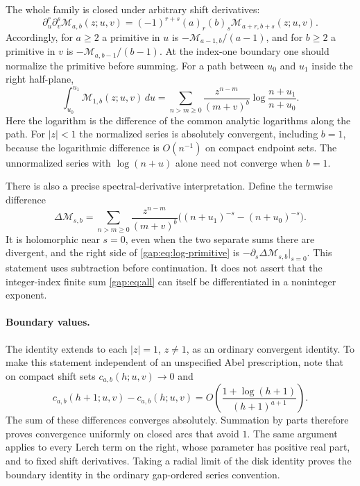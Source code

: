 The whole family is closed under arbitrary shift derivatives:
\begin{equation}\label{gap:eq:shift-jets}
 \partial_u^r\partial_v^s\mathcal M_{a,b}(z;u,v)
 =(-1)^{r+s}(a)_r(b)_s\mathcal M_{a+r,b+s}(z;u,v).
\end{equation}
Accordingly, for $a\geq2$ a primitive in $u$ is
$-\mathcal M_{a-1,b}/(a-1)$, and for $b\geq2$ a primitive in $v$ is
$-\mathcal M_{a,b-1}/(b-1)$. At the index-one boundary one should
normalize the primitive before summing. For a path between $u_0$ and
$u_1$ inside the right half-plane,
\begin{equation}\label{gap:eq:log-primitive}
 \int_{u_0}^{u_1}\mathcal M_{1,b}(z;u,v)\,du
 =\sum_{n>m\geq0}\frac{z^{n-m}}{(m+v)^b}
       \log\frac{n+u_1}{n+u_0}.
\end{equation}
Here the logarithm is the difference of the common analytic logarithms
along the path. For $|z|<1$ the normalized series is absolutely
convergent, including $b=1$, because the logarithmic difference is
$O(n^{-1})$ on compact endpoint sets. The unnormalized series with
$\log(n+u)$ alone need not converge when $b=1$.

There is also a precise spectral-derivative interpretation. Define the
termwise difference
\[
 \Delta\mathcal M_{s,b}
 =\sum_{n>m\geq0}\frac{z^{n-m}}{(m+v)^b}
       \bigl((n+u_1)^{-s}-(n+u_0)^{-s}\bigr).
\]
It is holomorphic near $s=0$, even when the two separate sums there
are divergent, and the right side of \eqref{gap:eq:log-primitive} is
$-\partial_s\Delta\mathcal M_{s,b}|_{s=0}$. This statement uses
subtraction before continuation. It does not assert that the
integer-index finite sum \eqref{gap:eq:all} can itself be
differentiated in a noninteger exponent.

\paragraph{Boundary values.}
The identity extends to each $|z|=1$, $z\ne1$, as an ordinary
convergent identity. To make this statement independent of an
unspecified Abel prescription, note that on compact shift sets
$c_{a,b}(h;u,v)\to0$ and
\[
 c_{a,b}(h+1;u,v)-c_{a,b}(h;u,v)
 =O\left(\frac{1+\log(h+1)}{(h+1)^{a+1}}\right).
\]
The sum of these differences converges absolutely. Summation by
parts therefore proves convergence uniformly on closed arcs that
avoid $1$. The same argument applies to every Lerch term on the
right, whose parameter has positive real part, and to fixed shift
derivatives. Taking a radial limit of the disk identity proves the
boundary identity in the ordinary gap-ordered series convention.

